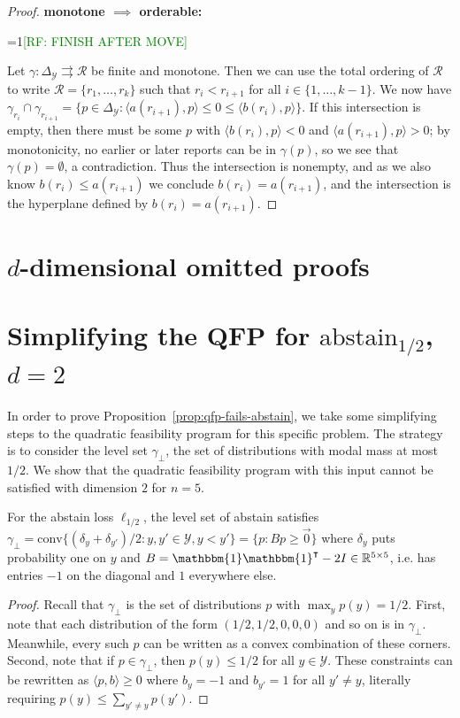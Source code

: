 \documentclass[anon]{colt2020} %
\newcommand{\Comments}{1}
\newcommand{\mynote}[2]{\ifnum\Comments=1\textcolor{#1}{#2}\fi}
\newcommand{\raf}[1]{\mynote{green}{[RF: #1]}}
\newcommand{\reals}{\mathbb{R}}
\newcommand{\abstain}[1]{\mathrm{abstain}_{#1}}
\newcommand{\simplex}{\Delta_\Y}
\newcommand{\R}{\mathcal{R}}
\newcommand{\Y}{\mathcal{Y}}
\newcommand{\inprod}[2]{\langle #1, #2 \rangle}%
\newcommand{\toto}{\rightrightarrows}
\newcommand{\conv}{\mathrm{conv}}
\newcommand{\ones}{\mathbbm{1}}
\begin{document}
\begin{proof}
  \noindent\textbf{monotone $\implies$ orderable:}
  
  \raf{FINISH AFTER MOVE}

  Let $\gamma:\simplex\toto\R$ be finite and monotone.
  Then we can use the total ordering of $\R$ to write $\R = \{r_1,\ldots,r_k\}$ such that $r_i < r_{i+1}$ for all $i \in \{1,\ldots,k-1\}$.
  We now have $\gamma_{r_i} \cap \gamma_{r_{i+1}} = \{p\in\simplex : \inprod{a(r_{i+1})}{p} \leq 0 \leq \inprod{b(r_i)}{p} \}$.
  If this intersection is empty, then there must be some $p$ with $\inprod{b(r_i)}{p} < 0$ and $\inprod{a(r_{i+1})}{p} > 0$; by monotonicity, no earlier or later reports can be in $\gamma(p)$, so we see that $\gamma(p) = \emptyset$, a contradiction.
  Thus the intersection is nonempty, and as we also know $b(r_i) \leq a(r_{i+1})$ we conclude $b(r_i) = a(r_{i+1})$, and the intersection is the hyperplane defined by $b(r_i) = a(r_{i+1})$.


\end{proof}



\section{$d$-dimensional omitted proofs}

\section{Simplifying the QFP for $\abstain{1/2}$, $d=2$}
In order to prove Proposition~\ref{prop:qfp-fails-abstain}, we take some simplifying steps to the quadratic feasibility program for this specific problem.
The strategy is to consider the level set $\gamma_{\bot}$, the set of distributions with modal mass at most $1/2$.
We show that the quadratic feasibility program with this input cannot be satisfied with dimension $2$ for $n=5$.

\begin{lemma} \label{lemma:abstain-v-h}
	For the abstain loss $\ell_{1/2}$, the level set of abstain satisfies $\gamma_{\bot} = \conv\{(\delta_y + \delta_{y'})/2 : y,y' \in \Y, y < y'\} = \{p : Bp \geq \vec{0}\}$ where $\delta_y$ puts probability one on $y$ and $B = \ones \ones^{\intercal} - 2I \in \reals^{5 \times 5}$, i.e. has entries $-1$ on the diagonal and $1$ everywhere else.
\end{lemma}
\begin{proof}
	Recall that $\gamma_{\bot}$ is the set of distributions $p$ with $\max_y p(y) = 1/2$.
	First, note that each distribution of the form $(1/2, 1/2, 0, 0, 0)$ and so on is in $\gamma_{\bot}$.
	Meanwhile, every such $p$ can be written as a convex combination of these corners.
	Second, note that if $p \in \gamma_{\bot}$, then $p(y) \leq 1/2$ for all $y \in \Y$.
	These constraints can be rewritten as $\inprod{p}{b} \geq 0$ where $b_y = -1$ and $b_{y'} = 1$ for all $y' \neq y$, literally requiring $p(y) \leq \sum_{y' \neq y} p(y')$.
\end{proof}
\end{document}
